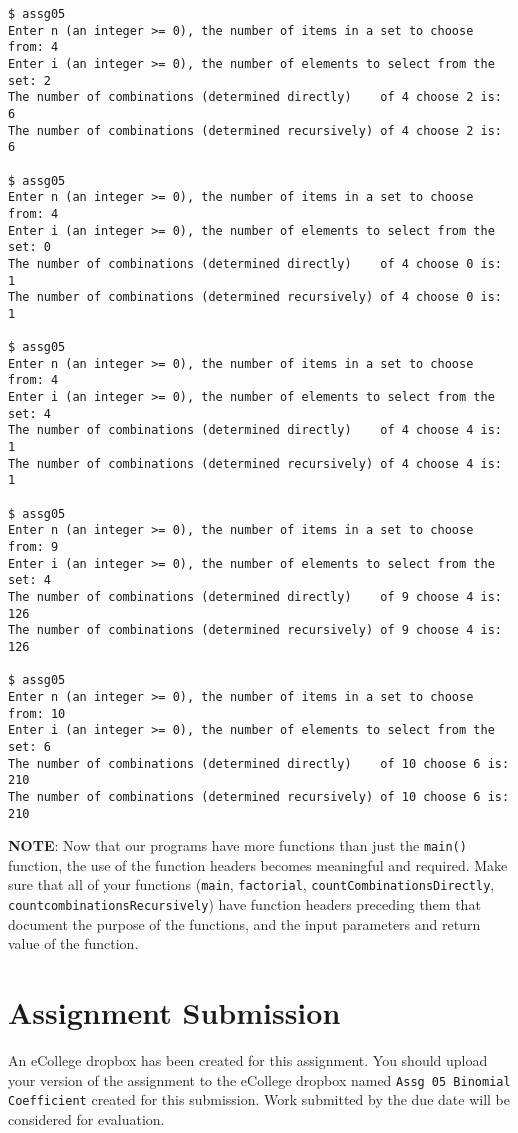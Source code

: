 \documentclass[11pt]{article}
\begin{document}
\begin{verbatim}
$ assg05 
Enter n (an integer >= 0), the number of items in a set to choose from: 4
Enter i (an integer >= 0), the number of elements to select from the set: 2
The number of combinations (determined directly)    of 4 choose 2 is: 6
The number of combinations (determined recursively) of 4 choose 2 is: 6

$ assg05 
Enter n (an integer >= 0), the number of items in a set to choose from: 4
Enter i (an integer >= 0), the number of elements to select from the set: 0
The number of combinations (determined directly)    of 4 choose 0 is: 1
The number of combinations (determined recursively) of 4 choose 0 is: 1

$ assg05 
Enter n (an integer >= 0), the number of items in a set to choose from: 4
Enter i (an integer >= 0), the number of elements to select from the set: 4
The number of combinations (determined directly)    of 4 choose 4 is: 1
The number of combinations (determined recursively) of 4 choose 4 is: 1

$ assg05 
Enter n (an integer >= 0), the number of items in a set to choose from: 9
Enter i (an integer >= 0), the number of elements to select from the set: 4
The number of combinations (determined directly)    of 9 choose 4 is: 126
The number of combinations (determined recursively) of 9 choose 4 is: 126

$ assg05 
Enter n (an integer >= 0), the number of items in a set to choose from: 10
Enter i (an integer >= 0), the number of elements to select from the set: 6
The number of combinations (determined directly)    of 10 choose 6 is: 210
The number of combinations (determined recursively) of 10 choose 6 is: 210
\end{verbatim}


\textbf{NOTE}: Now that our programs have more functions than just the
\verb~main()~ function, the use of the function headers becomes meaningful
and required.  Make sure that all of your functions (\verb~main~,
\verb~factorial~, \verb~countCombinationsDirectly~,
\verb~countcombinationsRecursively~) have function headers preceding them
that document the purpose of the functions, and the input parameters
and return value of the function.
\section*{Assignment Submission}
\label{sec-4}


An eCollege dropbox has been created for this assignment.  You should
upload your version of the assignment to the eCollege dropbox named
\verb~Assg 05 Binomial Coefficient~ created for this submission.  Work
submitted by the due date will be considered for evaluation.
\end{document}

